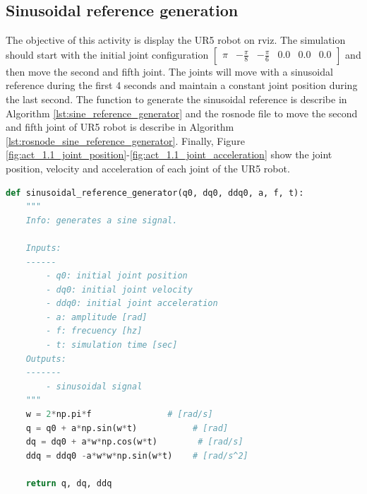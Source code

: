 \subsection{Sinusoidal reference generation}
The objective of this activity is display the UR5 robot on rviz. The simulation should start with the initial joint configuration $\begin{bmatrix} \pi & -\frac{\pi}{8} & -\frac{\pi}{6} & 0.0 & 0.0 & 0.0 \end{bmatrix}$ and then move the second and fifth joint. The joints will move with a sinusoidal reference during the first 4 seconds and maintain a constant joint position during the last second. The function to generate the sinusoidal reference is describe in Algorithm \ref{lst:sine_reference_generator} and the rosnode file to move the second and fifth joint of UR5 robot is describe in Algorithm \ref{lst:rosnode_sine_reference_generator}. Finally, Figure \ref{fig:act_1.1_joint_position}-\ref{fig:act_1.1_joint_acceleration} show the joint position, velocity and acceleration of each joint of the UR5 robot.

\begin{lstlisting}[language=Python,caption=Function to generate sinusoidal reference., label={lst:sine_reference_generator}]
    def sinusoidal_reference_generator(q0, dq0, ddq0, a, f, t):
    """
    Info: generates a sine signal.

    Inputs: 
    ------
        - q0: initial joint position
        - dq0: initial joint velocity
        - ddq0: initial joint acceleration
        - a: amplitude [rad]
        - f: frecuency [hz]
        - t: simulation time [sec]
    Outputs:
    -------
        - sinusoidal signal
    """
    w = 2*np.pi*f               # [rad/s]
    q = q0 + a*np.sin(w*t)           # [rad]
    dq = dq0 + a*w*np.cos(w*t)        # [rad/s]
    ddq = ddq0 -a*w*w*np.sin(w*t)    # [rad/s^2]

    return q, dq, ddq
\end{lstlisting}

